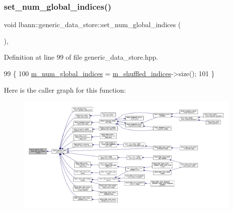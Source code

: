 \subsubsection{\texorpdfstring{set\+\_\+num\+\_\+global\+\_\+indices()}{set\_num\_global\_indices()}}
{\footnotesize\ttfamily void lbann\+::generic\+\_\+data\+\_\+store\+::set\+\_\+num\+\_\+global\+\_\+indices (\begin{DoxyParamCaption}{ }\end{DoxyParamCaption})\hspace{0.3cm}{\ttfamily [inline]}, {\ttfamily [protected]}}



Definition at line 99 of file generic\+\_\+data\+\_\+store.\+hpp.


\begin{DoxyCode}
99                                 \{
100     \hyperlink{classlbann_1_1generic__data__store_a0dfa2ffa01845b84ca477fb3e14a36c6}{m\_num\_global\_indices} = \hyperlink{classlbann_1_1generic__data__store_ad456f747ee07f63df15c60833dfb82ad}{m\_shuffled\_indices}->size();
101   \}
\end{DoxyCode}
Here is the caller graph for this function\+:\nopagebreak
\begin{figure}[H]
\begin{center}
\leavevmode
\includegraphics[width=350pt]{classlbann_1_1generic__data__store_a694438e0c70be757cc020ffc918fb165_icgraph}
\end{center}
\end{figure}
\mbox{\label{classlbann_1_1generic__data__store_abdf41bf60ba37fa3de49c65c178dc7b0}} 
